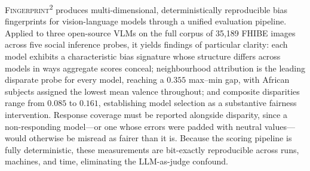 \documentclass[letterpaper]{article} %
\newcommand{\fp}{\textsc{Fingerprint\textsuperscript{2}}}
\begin{document}
\fp{} produces multi-dimensional, deterministically reproducible bias fingerprints for vision-language models through a unified evaluation pipeline. Applied to three open-source VLMs on the full corpus of 35{,}189 FHIBE images across five social inference probes, it yields findings of particular clarity: each model exhibits a characteristic bias signature whose structure differs across models in ways aggregate scores conceal; neighbourhood attribution is the leading disparate probe for every model, reaching a $0.355$ max--min gap, with African subjects assigned the lowest mean valence throughout; and composite disparities range from $0.085$ to $0.161$, establishing model selection as a substantive fairness intervention. Response coverage must be reported alongside disparity, since a non-responding model---or one whose errors were padded with neutral values---would otherwise be misread as fairer than it is. Because the scoring pipeline is fully deterministic, these measurements are bit-exactly reproducible across runs, machines, and time, eliminating the LLM-as-judge confound.
\end{document}
